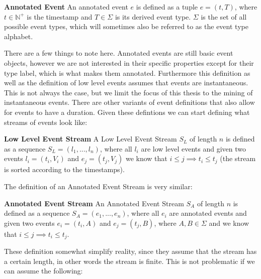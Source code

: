 \begin{mydef}
\textbf{Annotated Event} An annotated event $e$ is defined as a tuple $e=(t,T)$, where $t \in \mathbb{N}^+$ is the timestamp and $T \in \Sigma$ is its derived event type. $\Sigma$ is the set of all possible event types, which will sometimes also be referred to as the event type alphabet.
\end{mydef}
There are a few things to note here. Annotated events are still basic event objects, however we are not interested in their specific properties except for their type label, which is what makes them annotated.
Furthermore this definition as well as the definition of low level events assumes that events are instantaneous. This is not always the case, but we limit the focus of this thesis to the mining of instantaneous events. There are other variants of event definitions that also allow for events to have a duration. %
Given these defintions we can start defining what streams of events look like:
\begin{mydef}
\textbf{Low Level Event Stream} A Low Level Event Stream $S_L$ of length $n$ is defined as a sequence $S_L=(l_1,...,l_n)$, where all $l_i$ are low level events and given two events $l_i=(t_i,V_i)$ and $e_j=(t_j,V_j)$ we know that $i \leq j \implies t_i \leq t_j$ (the stream is sorted according to the timestamps).
\end{mydef}
The definition of an Annotated Event Stream is very similar:
\begin{mydef}
\textbf{Annotated Event Stream} An Annotated Event Stream $S_A$ of length $n$ is defined as a sequence $S_A=(e_1,...,e_n)$, where all $e_i$ are annotated events and given two events $e_i=(t_i,A)$ and $e_j=(t_j,B)$, where $A,B \in \Sigma$ and we know that $i \leq j \implies t_i \leq t_j$.
\end{mydef}
These definition somewhat simplify reality, since they assume that the stream has a certain length, in other words the stream is finite. This is not problematic if we can assume the following:

